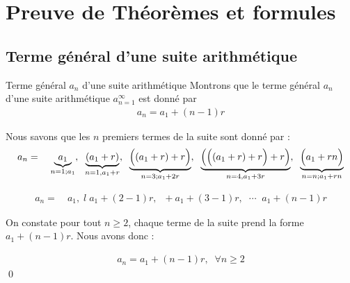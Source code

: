 \documentclass{report}
\begin{document}
\chapter{Preuve de Théorèmes et formules}

\section{Terme général d'une suite \textcolor{myb}{\textbf{arithmétique}}}
    \begin{Preuve}{Terme général $a_n$ d'une suite arithmétique}{}
       Montrons que le terme général $a_n$d'une suite arithmétique  
       $a_{n = 1}^{\infty}$ est donné par 
       \begin{align*}
            a_n = a_1 + (n - 1)r
       \end{align*}

       Nous savons que les $n$ premiers termes de la suite sont donné par : 
       \begin{align*}
           a_n = \quad
           \underbrace{a_1}_{n = 1; a_1}, \;\;
           \underbrace{(a_1 + r)}_{n = 1, a_1 + r}, \;\;
           \underbrace{\Bigl((a_1 + r) +r \Bigr)}_{n = 3; a_1 + 2r}, \;\;
           \underbrace{\Bigl(\Bigl( (a_1 + r) + r \Bigr) +r \Bigr)}_{n = 4, a_1 + 3r}, \;\;
           \underbrace{\Bigl(a_1 + rn \Bigr)}_{n = n; a_1 + rn}
       \end{align*}

       \begin{align*}
        a_n = \quad 
        a_1, \;l\; a_1 + (2 -1)r, \;\; + a_1 + (3 - 1)r,\;\;  \cdots \;\; a_1 + (n -1)r
       \end{align*} 


       On constate pour tout $n \geq 2$, chaque terme de la suite prend la forme 
       $a_1 + (n -1)r$. Nous avons donc : 

       \begin{align*}
            \boxed{ 
                a_n = a_1 + (n - 1)r, \;\; \forall n \geq 2
            }   
       \end{align*}         
       \qed
    \end{Preuve}
\end{document}
